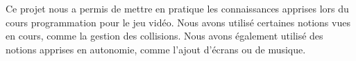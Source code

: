 Ce projet nous a permis de mettre en pratique les connaissances apprises lors du cours programmation pour le jeu vidéo. Nous avons utilisé certaines notions vues en cours, comme la gestion des collisions. Nous avons également utilisé des notions apprises en autonomie, comme l'ajout d'écrans ou de musique. 